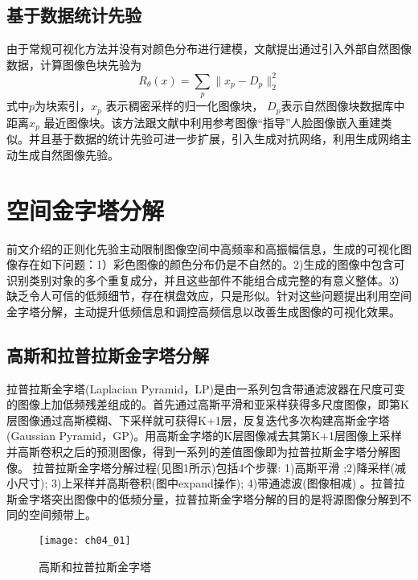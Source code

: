 \subsection{基于数据统计先验}

	由于常规可视化方法并没有对颜色分布进行建模，文献\citep{Lenc2015}提出通过引入外部自然图像数据，计算图像色块先验为
\begin{equation} \label{eq:ch04_07}
       R_{\theta}(x)= \sum_{p}\parallel x_{p}-D_{p}\parallel _{2}^{2}
\end{equation}
式中$p$为块索引，$x_{p}$ 表示稠密采样的归一化图像块， $D_{p}$表示自然图像块数据库中距离$x_{p}$ 最近图像块。该方法跟文献\citep{Huang2017c}中利用参考图像“指导”人脸图像嵌入重建类似。并且基于数据的统计先验可进一步扩展，引入生成对抗网络，利用生成网络主动生成自然图像先验\citep{Nguyen2016a}。

 
 
\section{空间金字塔分解}
 
前文介绍的正则化先验主动限制图像空间中高频率和高振幅信息，生成的可视化图像存在如下问题：1）彩色图像的颜色分布仍是不自然的。2)生成的图像中包含可识别类别对象的多个重复成分，并且这些部件不能组合成完整的有意义整体。3）缺乏令人可信的低频细节，存在棋盘效应，只是形似。针对这些问题提出利用空间金字塔分解，主动提升低频信息和调控高频信息以改善生成图像的可视化效果。

\subsection{高斯和拉普拉斯金字塔分解}
 
拉普拉斯金字塔(Laplacian Pyramid，LP)\citep{Burt1983}是由一系列包含带通滤波器在尺度可变的图像上加低频残差组成的。首先通过高斯平滑和亚采样获得多尺度图像，即第K层图像通过高斯模糊、下采样就可获得K+1层，反复迭代多次构建高斯金字塔(Gaussian Pyramid，GP)。用高斯金字塔的K层图像减去其第K+1层图像上采样并高斯卷积之后的预测图像，得到一系列的差值图像即为拉普拉斯金字塔分解图像。
拉普拉斯金字塔分解过程(见图1所示)包括4个步骤: 1)高斯平滑 ;2)降采样(减小尺寸); 3)上采样并高斯卷积(图中expand操作); 4)带通滤波(图像相减) 。拉普拉斯金字塔突出图像中的低频分量，拉普拉斯金字塔分解的目的是将源图像分解到不同的空间频带上。
\begin{figure}[!htbp]
\centering
\texttt{[image: ch04\_01]}
\caption{高斯和拉普拉斯金字塔}
\label{fig:ch04_01}
\end{figure}

